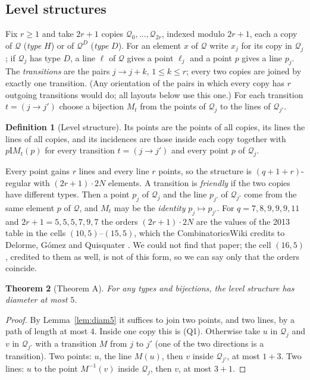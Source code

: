 \documentclass[11pt]{amsart}
\newtheorem{theorem}{Theorem}[section]
\theoremstyle{definition}
\newtheorem{definition}[theorem]{Definition}
\theoremstyle{remark}
\newcommand{\I}{\mathrel{\mathrm{I}}}
\newcommand{\cQ}{\mathcal{Q}}
\begin{document}
\subsection{Level structures}\label{ssec:levels5}
Fix $r\ge1$ and take $2r+1$ copies $\cQ_0,\dots,\cQ_{2r}$, indexed modulo $2r+1$, each a copy of $\cQ$ (\emph{type} $H$) or of $\cQ^D$ (\emph{type} $D$). For an element $x$ of $\cQ$ write $x_j$ for its copy in $\cQ_j$; if $\cQ_j$ has type $D$, a line $\ell$ of $\cQ$ gives a point $\ell_j$ and a point $p$ gives a line $p_j$. The \emph{transitions} are the pairs $j\to j+k$, $1\le k\le r$; every two copies are joined by exactly one transition. (Any orientation of the pairs in which every copy has $r$ outgoing transitions would do; all layouts below use this one.) For each transition $t=(j\to j')$ choose a bijection $M_t$ from the points of $\cQ_j$ to the lines of $\cQ_{j'}$.

\begin{definition}[Level structure]\label{def:levels5}
Its points are the points of all copies, its lines the lines of all copies, and its incidences are those inside each copy together with $p\I M_t(p)$ for every transition $t=(j\to j')$ and every point $p$ of $\cQ_j$.
\end{definition}

Every point gains $r$ lines and every line $r$ points, so the structure is $(q+1+r)$-regular with $(2r+1)\cdot 2N$ elements. A transition is \emph{friendly} if the two copies have different types. Then a point $p_j$ of $\cQ_j$ and the line $p_{j'}$ of $\cQ_{j'}$ come from the same element $p$ of $\cQ$, and $M_t$ may be the \emph{identity} $p_j\mapsto p_{j'}$. For $q=7,8,9,9,9,11$ and $2r+1=5,5,5,7,9,7$ the orders $(2r+1)\cdot2N$ are the values of the 2013 table in the cells $(10,5)$--$(15,5)$, which the CombinatoricsWiki \cite{LPP} credits to Delorme, G\'omez and Quisquater \cite{DGQ}. We could not find that paper; the cell $(16,5)$, credited to them as well, is not of this form, so we can say only that the orders coincide.

\begin{theorem}[Theorem A]\label{thm:levelA5}
For any types and bijections, the level structure has diameter at most $5$.
\end{theorem}

\begin{proof}
By Lemma~\ref{lem:diam5} it suffices to join two points, and two lines, by a path of length at most $4$. Inside one copy this is (Q1). Otherwise take $u$ in $\cQ_j$ and $v$ in $\cQ_{j'}$ with a transition $M$ from $j$ to $j'$ (one of the two directions is a transition). Two points: $u$, the line $M(u)$, then $v$ inside $\cQ_{j'}$, at most $1+3$. Two lines: $u$ to the point $M^{-1}(v)$ inside $\cQ_j$, then $v$, at most $3+1$.
\end{proof}
\end{document}
